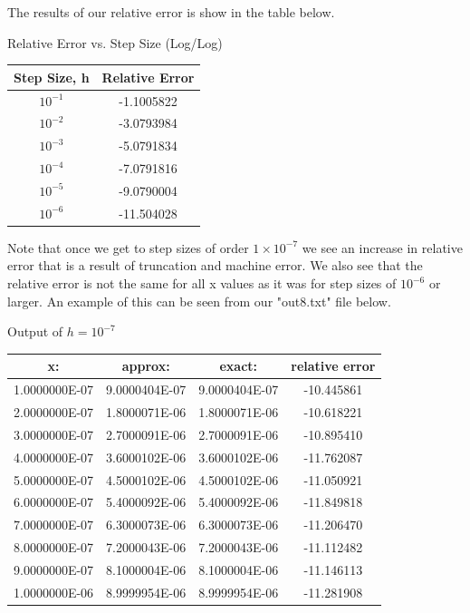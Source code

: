 \documentclass{article}
\begin{document}
The results of our relative error is show in the table below.

\begin{center}
	Relative Error vs. Step Size (Log/Log)\\
	\begin{tabular}{|c|c|}
		\hline
		Step Size, h & Relative Error\\
		\hline
		$10^{-1}$ & -1.1005822\\
		\hline
		$10^{-2}$ & -3.0793984\\
		\hline
		$10^{-3}$ & -5.0791834\\
		\hline
		$10^{-4}$ & -7.0791816\\
		\hline
		$10^{-5}$ & -9.0790004 \\
		\hline
		$10^{-6}$ & -11.504028\\
		\hline
	\end{tabular}
\end{center}

Note that once we get to step sizes of order $1 \times 10^{-7}$ we see an increase in relative error that is a result of truncation and machine error. We also see that the relative error is not the same for all x values as it was for step sizes of $10^{-6}$ or larger. An example of this can be seen from our "out8.txt" file below.

\begin{center}
	Output of $h=10^{-7}$ \\
	\begin{tabular}{|c|c|c|c|}
\hline
     x:     &        approx:       &   exact:    &   relative error\\
     \hline
1.0000000E-07 & 9.0000404E-07&  9.0000404E-07  &   -10.445861\\
2.0000000E-07  &1.8000071E-06  &1.8000071E-06     &-10.618221\\
3.0000000E-07  &2.7000091E-06  &2.7000091E-06     &-10.895410\\
4.0000000E-07  &3.6000102E-06  &3.6000102E-06     &-11.762087\\
5.0000000E-07  &4.5000102E-06  &4.5000102E-06     &-11.050921\\
6.0000000E-07  &5.4000092E-06  &5.4000092E-06     &-11.849818\\
7.0000000E-07  &6.3000073E-06  &6.3000073E-06     &-11.206470\\
8.0000000E-07  &7.2000043E-06  &7.2000043E-06    & -11.112482\\
9.0000000E-07  &8.1000004E-06  &8.1000004E-06    & -11.146113\\
1.0000000E-06  &8.9999954E-06  &8.9999954E-06    & -11.281908\\
\hline
	\end{tabular}
\end{center}
\end{document}
